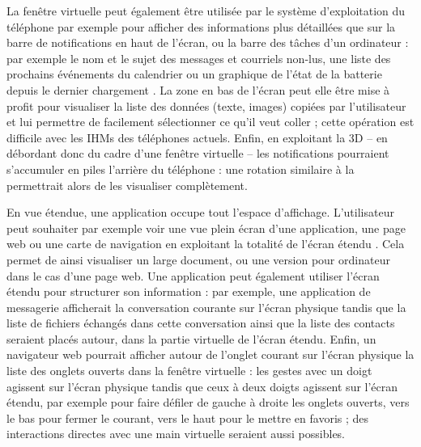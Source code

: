 La fenêtre virtuelle peut également être utilisée par le système d'exploitation du téléphone par exemple pour afficher des informations plus détaillées que sur la barre de notifications en haut de l'écran, ou la barre des tâches d'un ordinateur : par exemple le nom et le sujet des messages et courriels non-lus, une liste des prochains événements du calendrier ou un graphique de l'état de la batterie depuis le dernier chargement . La zone en bas de l'écran peut elle être mise à profit pour visualiser la liste des données (texte, images) copiées par l'utilisateur et lui permettre de facilement sélectionner ce qu'il veut coller ; cette opération est difficile avec les IHMs des téléphones actuels. Enfin, en exploitant la 3D -- en débordant donc du cadre d'une fenêtre virtuelle -- les notifications pourraient s'accumuler en piles l'arrière du téléphone : une rotation similaire à la  permettrait alors de les visualiser complètement.


En vue étendue, une application occupe tout l'espace d'affichage. L'utilisateur peut souhaiter par exemple voir une vue plein écran d'une application, une page web ou une carte de navigation en exploitant la totalité de l'écran étendu . Cela permet de ainsi visualiser un large document, ou une version pour ordinateur dans le cas d'une page web. Une application peut également utiliser l'écran étendu pour structurer son information : par exemple, une application de messagerie afficherait la conversation courante sur l'écran physique tandis que la liste de fichiers échangés dans cette conversation ainsi que la liste des contacts seraient placés autour, dans la partie virtuelle de l'écran étendu. Enfin, un navigateur web pourrait afficher autour de l'onglet courant sur l'écran physique la liste des onglets ouverts dans la fenêtre virtuelle : les gestes avec un doigt agissent sur l'écran physique tandis que ceux à deux doigts agissent sur l'écran étendu, par exemple pour faire défiler de gauche à droite les onglets ouverts, vers le bas pour fermer le courant, vers le haut pour le mettre en favoris ; des interactions directes avec une main virtuelle seraient aussi possibles.

